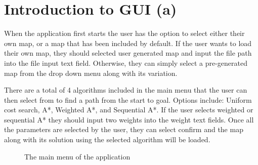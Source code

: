 \section{Introduction to GUI (a)}

When the application first starts the user has the option to select either their own
map, or a map that has been included by default. If the user wants to load their own map, they should selected
user generated map and input the file path into the file input text field. Otherwise, they
can simply select a pre-generated map from the drop down menu along with its variation.

There are a total of 4 algorithms included in the main menu that the user can then select from to find a path
from the start to goal. Options include: Uniform cost search, A*, Weighted A*, and Sequential A*. If the
user selects weighted or sequential A* they should input two weights into the weight text fields. Once all the parameters
are selected by the user, they can select confirm and the map along with its solution using the selected algorithm
will be loaded.


\begin{figure}[H]
	\centering
	\caption{The main menu of the application}
	\label{fig: Main menu}
\end{figure}
